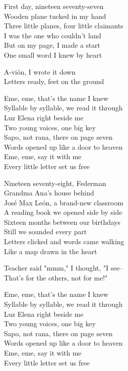 \begin{lyrics}
First day, nineteen seventy-seven\\
Wooden plane tucked in my hand\\
Three little planes, four little claimants\\
I was the one who couldn't land\\
But on my page, I made a start\\
One small word I knew by heart

A-vión, I wrote it down\\
Letters ready, feet on the ground

Eme, eme, that's the name I knew\\
Syllable by syllable, we read it through\\
Luz Elena right beside me\\
Two young voices, one big key\\
Sapo, not rana, there on page seven\\
Words opened up like a door to heaven\\
Eme, eme, say it with me\\
Every little letter set us free

Nineteen seventy-eight, Federman\\
Grandma Ana's house behind\\
José Max León, a brand-new classroom\\
A reading book we opened side by side\\
Sixteen months between our birthdays\\
Still we sounded every part\\
Letters clicked and words came walking\\
Like a map drawn in the heart

Teacher said "mmm," I thought, "I see--\\
That's for the others, not for me!"

Eme, eme, that's the name I knew\\
Syllable by syllable, we read it through\\
Luz Elena right beside me\\
Two young voices, one big key\\
Sapo, not rana, there on page seven\\
Words opened up like a door to heaven\\
Eme, eme, say it with me\\
Every little letter set us free


\end{lyrics}
